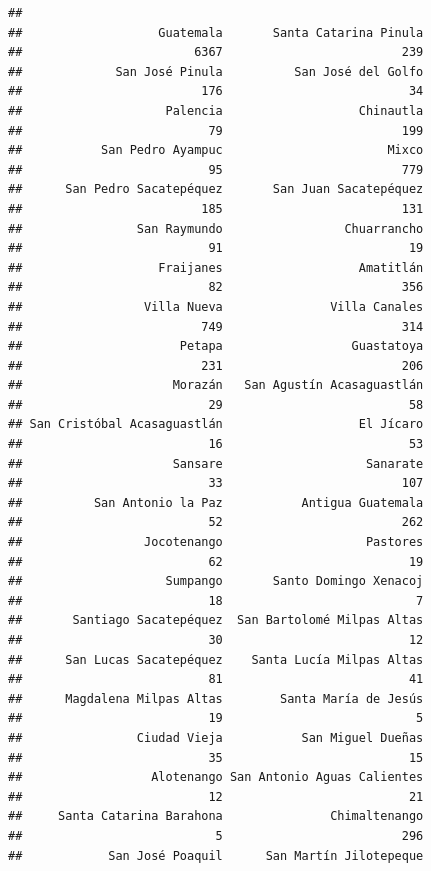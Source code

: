 \documentclass[
]{article}
\begin{document}
\begin{verbatim}
## 
##                   Guatemala       Santa Catarina Pinula 
##                        6367                         239 
##             San José Pinula          San José del Golfo 
##                         176                          34 
##                    Palencia                   Chinautla 
##                          79                         199 
##           San Pedro Ayampuc                       Mixco 
##                          95                         779 
##      San Pedro Sacatepéquez       San Juan Sacatepéquez 
##                         185                         131 
##                San Raymundo                 Chuarrancho 
##                          91                          19 
##                   Fraijanes                   Amatitlán 
##                          82                         356 
##                 Villa Nueva               Villa Canales 
##                         749                         314 
##                      Petapa                  Guastatoya 
##                         231                         206 
##                     Morazán   San Agustín Acasaguastlán 
##                          29                          58 
## San Cristóbal Acasaguastlán                   El Jícaro 
##                          16                          53 
##                     Sansare                    Sanarate 
##                          33                         107 
##          San Antonio la Paz           Antigua Guatemala 
##                          52                         262 
##                 Jocotenango                    Pastores 
##                          62                          19 
##                    Sumpango       Santo Domingo Xenacoj 
##                          18                           7 
##       Santiago Sacatepéquez  San Bartolomé Milpas Altas 
##                          30                          12 
##      San Lucas Sacatepéquez    Santa Lucía Milpas Altas 
##                          81                          41 
##      Magdalena Milpas Altas        Santa María de Jesús 
##                          19                           5 
##                Ciudad Vieja           San Miguel Dueñas 
##                          35                          15 
##                  Alotenango San Antonio Aguas Calientes 
##                          12                          21 
##     Santa Catarina Barahona               Chimaltenango 
##                           5                         296 
##            San José Poaquil      San Martín Jilotepeque 

\end{verbatim}
\end{document}
